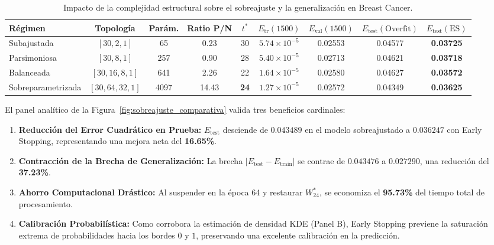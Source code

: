 \documentclass[11pt,letterpaper]{article}
\begin{document}
\begin{table}[htbp]
\centering
\small
\caption{Impacto de la complejidad estructural sobre el sobreajuste y la generalización en Breast Cancer.}
\label{tab:complejidad_arquitecturas}
\begin{adjustbox}{max width=\textwidth}
\begin{tabular}{l c c c c c c c c}
\toprule
\textbf{Régimen} & \textbf{Topología} & \textbf{Parám.} & \textbf{Ratio P/N} & $t^*$ & $E_{\text{tr}}(1500)$ & $E_{\text{val}}(1500)$ & $E_{\text{test}}(\text{Overfit})$ & $E_{\text{test}}(\text{ES})$ \\
\midrule
Subajustada & $[30, 2, 1]$ & 65 & 0.23 & 30 & $5.74 \times 10^{-5}$ & 0.02553 & 0.04577 & \textbf{0.03725} \\
Parsimoniosa & $[30, 8, 1]$ & 257 & 0.90 & 28 & $5.40 \times 10^{-5}$ & 0.02713 & 0.04621 & \textbf{0.03718} \\
Balanceada & $[30, 16, 8, 1]$ & 641 & 2.26 & 22 & $1.64 \times 10^{-5}$ & 0.02580 & 0.04627 & \textbf{0.03572} \\
Sobreparametrizada & $[30, 64, 32, 1]$ & 4097 & 14.43 & \textbf{24} & $1.27 \times 10^{-5}$ & 0.02572 & 0.04349 & \textbf{0.03625} \\
\bottomrule
\end{tabular}
\end{adjustbox}
\end{table}

El panel analítico de la Figura~\ref{fig:sobreajuste_comparativa} valida tres beneficios cardinales:
\begin{enumerate}
    \item \textbf{Reducción del Error Cuadrático en Prueba:} $E_{\text{test}}$ desciende de $0.043489$ en el modelo sobreajustado a $0.036247$ con Early Stopping, representando una mejora neta del \textbf{16.65\%}.
    \item \textbf{Contracción de la Brecha de Generalización:} La brecha $|E_{\text{test}} - E_{\text{train}}|$ se contrae de $0.043476$ a $0.027290$, una reducción del \textbf{37.23\%}.
    \item \textbf{Ahorro Computacional Drástico:} Al suspender en la época 64 y restaurar $W_{24}^*$, se economiza el \textbf{95.73\%} del tiempo total de procesamiento.
    \item \textbf{Calibración Probabilística:} Como corrobora la estimación de densidad KDE (Panel B), Early Stopping previene la saturación extrema de probabilidades hacia los bordes $0$ y $1$, preservando una excelente calibración en la predicción.
\end{enumerate}
\end{document}

